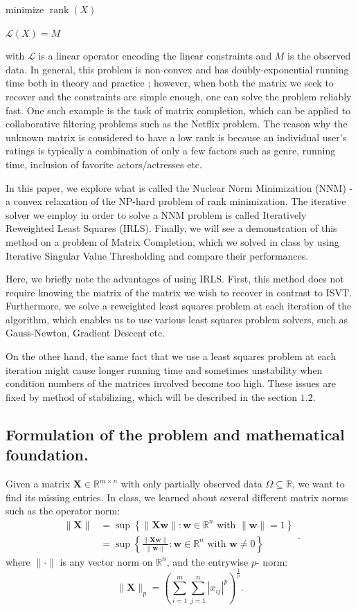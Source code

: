 \documentclass[12pt]{article}
\def \bw{\boldsymbol{w}}
\def \bX{\boldsymbol{X}}
\def\R{{\mathbb R}}
\DeclareMathOperator{\rank}{rank}
\begin{document}
\centerline{minimize $\rank (X)$}
\centerline{$\mathcal{L}(X) = M$}
with $\mathcal{L}$ is a linear operator encoding the linear constraints and $M$ is the observed data. In general, this problem is non-convex and has doubly-exponential running time both in theory and practice \cite{NNM}; however, when both the matrix we seek to recover and the constraints are simple enough, one can solve the problem reliably fast. One such example is the task of matrix completion, which can be applied to collaborative filtering problems such as the Netflix problem. The reason why the unknown matrix is considered to have a low rank is because an individual user's ratings is typically a combination of only a few factors such as genre, running time, inclusion of favorite actors/actresses etc.  

In this paper, we explore what is called the Nuclear Norm Minimization (NNM) -  a convex relaxation of the NP-hard problem of rank minimization. The iterative solver we employ in order to solve a NNM problem is called Iteratively Reweighted Least Squares (IRLS). Finally, we will see a demonstration of this method on a problem of Matrix Completion, which we solved in class by using Iterative Singular Value Thresholding and compare their performances. 

Here, we briefly note the advantages of using IRLS. First, this method does not require knowing the matrix of the matrix we wish to recover in contrast to ISVT. Furthermore, we solve a reweighted least squares problem at each iteration of the algorithm, which enables us to use various least squares problem solvers, such as Gauss-Newton, Gradient Descent etc.

On the other hand, the same fact that we use a least squares problem at each iteration might cause longer running time and sometimes unstability when condition numbers of the matrices involved become too high. These issues are fixed by method of stabilizing, which will be described in the section $1.2. $

\subsection{Formulation of the problem and mathematical foundation.} 

Given a matrix $\bX \in \mathbb{R}^{m \times n}$ with only partially observed data  $\Omega\subseteq\R$, we want to find its missing entries. In class, we learned about several different matrix norms such as the operator norm:
\[\begin{aligned}\|\bX\| &=\sup \left\{\|\bX \bw\|: \bw \in \R^{n} \text { with }\|\bw\|=1\right\} \\ &=\sup \left\{\frac{\|\bX \bw\|}{\|\bw\|}: \bw \in \R^{n} \text { with } \bw \neq 0\right\} \end{aligned}
    .\]
where $\|\cdot\|$ is any vector norm on $\R^n$, and the entrywise $p$- norm:
\[\|\bX\|_p =\left(\sum_{i=1}^m\sum_{j=1}^n
    |x_{ij}|^{p}\right)^{\frac{1}{p}}.\]
    
\end{document}
